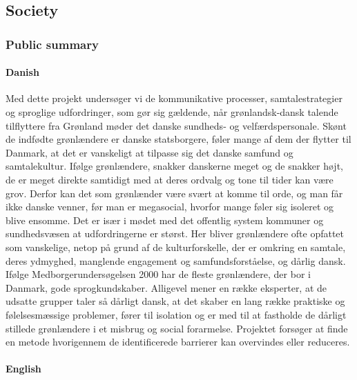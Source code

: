 \documentclass[twocolumn, serif, rga, authordate]{jote-article}
\begin{document}
\subsection*{Society}



\subsubsection*{Public summary}


\paragraph{Danish}

Med dette projekt undersøger vi de kommunikative processer, samtalestrategier og sproglige udfordringer, som gør sig gældende, når grønlandsk-dansk talende tilflyttere fra Grønland møder det danske sundheds- og velfærdspersonale. Skønt de indfødte grønlændere er danske statsborgere, føler mange af dem der flytter til Danmark, at det er vanskeligt at tilpasse sig det danske samfund og samtalekultur. Ifølge grønlændere, snakker danskerne meget og de snakker højt, de er meget direkte samtidigt med at deres ordvalg og tone til tider kan være grov.
Derfor kan det som grønlænder være svært at komme til orde, og man får ikke danske venner, før man er megasocial, hvorfor mange føler sig isoleret og blive ensomme. Det er især i mødet med det offentlig system kommuner og sundhedsvæsen at udfordringerne er størst. Her bliver grønlændere ofte opfattet som vanskelige, netop på grund af de kulturforskelle, der er omkring en samtale, deres ydmyghed, manglende engagement og samfundsforståelse, og dårlig dansk. Ifølge Medborgerundersøgelsen 2000 har de fleste grønlændere, der bor i Danmark, gode sprogkundskaber. Alligevel mener en række eksperter, at de udsatte grupper taler så dårligt dansk, at det skaber en lang række praktiske og følelsesmæssige problemer, fører til isolation og er med til at fastholde de dårligt stillede grønlændere i et misbrug og social forarmelse. Projektet forsøger at finde en metode hvorigennem de identificerede barrierer kan overvindes eller reduceres.

\paragraph{English}
\end{document}
